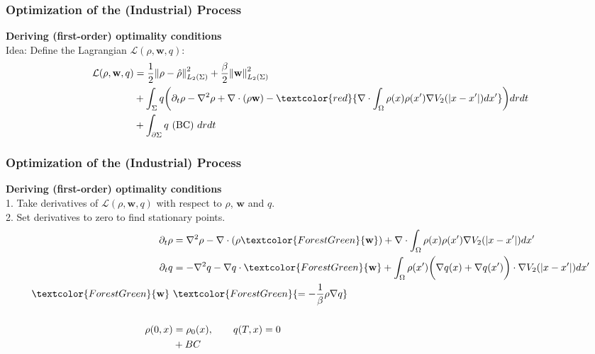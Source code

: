 \documentclass[aspectratio=169,xcolor=dvipsnames]{beamer}
\begin{document}
\begin{frame}
\frametitle{Optimization of the (Industrial) Process}
\textbf{Deriving (first-order) optimality conditions}\\
Idea: Define the Lagrangian $\mathcal{L}(\rho, \mathbf{w}, q)$:
\begin{align*}
\mathcal{L}(\rho, \mathbf{w},q)&= \frac{1}{2}\norm{\rho- \hat{\rho}}_{L_2(\Sigma)}^2 + \frac{\beta}{2} \norm{\mathbf{w}}_{L_2(\Sigma)}^2\\
&+ \int_\Sigma q \bigg( \partial_t \rho - \nabla^2 \rho + \nabla \cdot (\rho \mathbf{w})
-\textcolor{red}{ \nabla \cdot\int_\Omega \rho(x) \rho(x') \nabla V_2(|x-x'|)dx'}    \bigg) dr dt\\
&+ \int_{\partial \Sigma} q \text{ (BC) } dr dt
\end{align*}
\end{frame}
\begin{frame}
	\frametitle{Optimization of the (Industrial) Process}
	\textbf{Deriving (first-order) optimality conditions}\\
	1. Take derivatives of $\mathcal{L}(\rho, \mathbf{w}, q)$ with respect to $\rho$, $\mathbf{w}$ and $q$. \\
	2. Set derivatives to zero to find stationary points. \\
	\begin{align*}
	 \partial_t \rho &= \nabla^2 \rho - \nabla \cdot (\rho \textcolor{ForestGreen}{\mathbf{w}})
	+ \nabla \cdot \int_\Omega \rho(x) \rho(x') \nabla V_2(|x-x'|)dx'  \\
	\partial_t q &= -\nabla^2 q - \nabla q \cdot \textcolor{ForestGreen}{\mathbf{w}} + \int_\Omega \rho(x') \bigg(\nabla q(x) + \nabla q(x')\bigg)\cdot  \nabla V_2(|x-x'|)dx' \\
    \textcolor{ForestGreen}{\mathbf{w} } \ &\textcolor{ForestGreen}{= - \frac{1}{\beta}\rho \nabla q }\\
    \\
    \rho(0,x)&=\rho_0(x), \qquad q(T,x)= 0 \\
    &+ BC
	\end{align*}
\end{frame}
\end{document}
